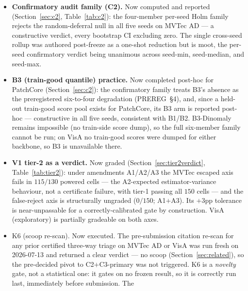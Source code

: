 \documentclass[preprint,11pt]{elsarticle}
\begin{document}
\begin{itemize}
  \item \textbf{Confirmatory audit family (C2).} Now computed and reported
        (Section~\ref{sec:c2}, Table~\ref{tab:c2}): the four-member per-seed Holm family rejects the
        random-deferral null in all five seeds on MVTec AD --- a constructive verdict, every
        bootstrap CI excluding zero. The single cross-seed rollup was authored post-freeze as a
        one-shot reduction but is moot, the per-seed confirmatory verdict being unanimous across
        seed-min, seed-median, and seed-max.
  \item \textbf{B3 (train-good quantile) practice.} Now completed post-hoc for PatchCore
        (Section~\ref{sec:c2}): the confirmatory family treats B3's absence as the preregistered
        six-to-four degradation (PREREG~\S4), and, since a held-out train-good score pool exists for
        PatchCore, its B3 arm is reported post-hoc --- constructive in all five seeds, consistent
        with B1/B2. B3-Dinomaly remains impossible (no train-side score dump), so the full
        six-member family cannot be run; on VisA no train-good scores were dumped for either
        backbone, so B3 is unavailable there.
  \item \textbf{V1 tier-2 as a verdict.} Now graded (Section~\ref{sec:tier2verdict},
        Table~\ref{tab:tier2}):
        under amendments A1/A2/A3 the MVTec escaped axis fails in $115/130$
        powered cells --- the A2-expected estimator-variance behaviour, not a certificate failure,
        with tier-1 passing all $150$ cells --- and the false-reject axis is structurally ungraded
        ($0/150$; A1$+$A3). Its $+3$pp tolerance is near-unpassable for a correctly-calibrated gate
        by construction. VisA (exploratory) is partially gradeable on both axes.
  \item K6 (scoop re-scan). Now executed. The pre-submission citation re-scan for any prior
        certified three-way triage on MVTec AD or VisA was run fresh on 2026-07-13 and returned a
        clear verdict --- no scoop (Section~\ref{sec:related}), so the pre-decided pivot to
        C2$+$C3-primary was not triggered. K6 is a \emph{novelty} gate, not a statistical one: it
        gates on no frozen result, so it is correctly run last, immediately before submission. The

\end{itemize}
\end{document}
